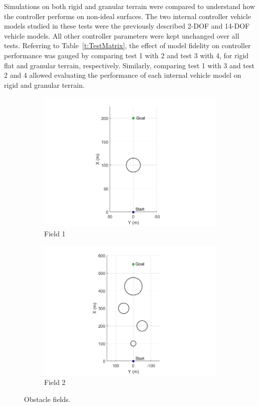 \documentclass[12pt,onecolumn]{report}
\begin{document}
Simulations on both rigid and granular terrain were compared to understand how the controller performs on non-ideal surfaces.  The two internal controller vehicle models studied in these tests were the previously described 2-DOF and 14-DOF vehicle models. All other controller parameters were kept unchanged over all tests. Referring to Table~\ref{t:TestMatrix}, the effect of model fidelity on controller performance was gauged by comparing test 1 with 2 and test 3 with 4, for rigid flat and granular terrain, respectively.
Similarly, comparing test 1 with 3 and test 2 and 4 allowed evaluating the performance of each internal vehicle model on rigid and granular terrain.

\begin{figure}
	\centering
	\begin{subfigure}[b]{0.49\columnwidth}
		\centering
		\includegraphics[width=\textwidth]{Figs/ObstacleField1.png}
		\caption{{\small Field 1}}   
		\label{fig:Obst1}
	\end{subfigure}
	\hfill
	\begin{subfigure}[b]{0.49\columnwidth}
		\centering
		\includegraphics[width=\columnwidth]{Figs/ObstacleField2.png}
		\caption{\small Field 2}   
		\label{fig:Obst2}
	\end{subfigure}
	\caption{\small Obstacle fields.}
	\label{fig:Obst}
\end{figure}
\end{document}
